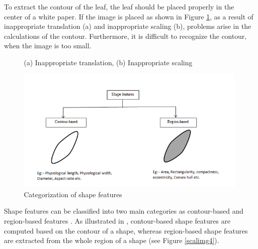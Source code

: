 \documentclass{article}
\begin{document}
To extract the contour of the leaf, the leaf should be placed
properly in the center of a white paper. If the image is placed as shown
in Figure \ref{fig:trans}, as a result of inappropriate translation (a)
and inappropriate scaling (b), problems arise in the calculations of
the contour. Furthermore, it is difficult to recognize the contour, when
the image is too small.



\begin{figure}[!ht]

{\centering {}

}

\caption{\label{trans} (a) Inappropriate translation,  (b) Inappropriate scaling }\label{fig:trans}
\end{figure}

\begin{figure}[!ht]

{\centering \includegraphics[width=0.6\linewidth]{leaffeatures/shape_chart_new.png} 

}

\caption{\label{scalimg4}Categorization of shape features}\label{fig:unnamed-chunk-7}
\end{figure}

Shape features can be classified into two main categories as
contour-based and region-based features \citep{articlee}. As
illustrated in \citep{articlee}, contour-based shape features
are computed based on the contour of a shape, whereas region-based shape
features are extracted from the whole region of a shape (see Figure
\ref{scalimg4}).
\end{document}
